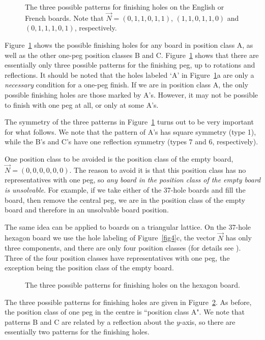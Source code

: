 \documentclass[12pt,reqno]{article}
\begin{document}
\begin{figure}[htb]
\centering
{}
\caption{The three possible patterns for finishing holes on the English or French boards.
Note that $\vec{N}=(0,1,1,0,1,1)$, $(1,1,0,1,1,0)$ and $(0,1,1,1,0,1)$, respectively.}
\label{fig2}
\end{figure}

Figure~\ref{fig2} shows the possible finishing holes for any board in position class A,
as well as the other one-peg position classes B and C.
Figure~\ref{fig2} shows that there are essentially only three possible patterns for the finishing peg,
up to rotations and reflections.
It should be noted that the holes labeled `A' in Figure~\ref{fig2}a are only a {\it necessary}
condition for a one-peg finish.
If we are in position class A, the only possible finishing holes are those marked by A's.
However, it may not be possible to finish with one peg at all, or only at some A's.

The symmetry of the three patterns in Figure~\ref{fig2} turns out to be very important for what follows.
We note that the pattern of A's has square symmetry (type 1),
while the B's and C's have one reflection symmetry
(types 7 and 6, respectively).

One position class to be avoided is the position class of the empty board, $\vec{N}=(0,0,0,0,0,0)$.
The reason to avoid it is that this position class has no representatives with one peg,
so \textit{any board in the position class of the empty board is unsolvable}.
For example, if we take either of the 37-hole boards and fill the board, then remove the central peg,
we are in the position class of the empty board and therefore in an unsolvable board position.

The same idea can be applied to boards on a triangular lattice.
On the 37-hole hexagon board we use the hole labeling of Figure~\ref{fig4}c,
the vector $\vec{N}$ has only three components,
and there are only four position classes (for details see \cite{BellSol}).
Three of the four position classes have representatives with one peg,
the exception being the position class of the empty board.

\begin{figure}[htb]
\centering
{}
\caption{The three possible patterns for finishing holes on the hexagon board.}
\label{fig3}
\end{figure}

The three possible patterns for finishing holes are given in Figure~\ref{fig3}.
As before, the position class of one peg in the centre is ``position class A".
We note that patterns B and C are related by a reflection about the $y$-axis,
so there are essentially two patterns for the finishing holes.
\end{document}
